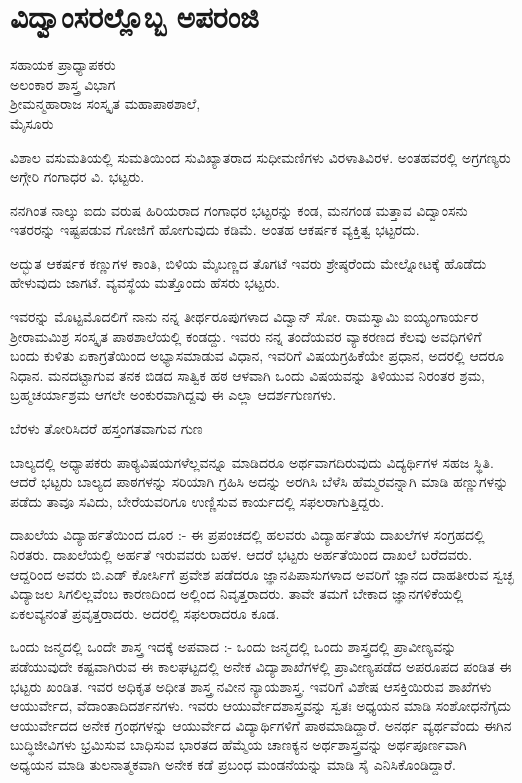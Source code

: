 \chapter{ವಿದ್ವಾಂಸರಲ್ಲೊಬ್ಬ ಅಪರಂಜಿ}

\begin{center}
\smallskip

ಸಹಾಯಕ ಪ್ರಾಧ್ಯಾಪಕರು\\
ಅಲಂಕಾರ ಶಾಸ್ತ್ರ ವಿಭಾಗ\\
ಶ್ರೀಮನ್ಮಹಾರಾಜ ಸಂಸ್ಕೃತ ಮಹಾಪಾಠಶಾಲೆ,\\ 
ಮೈಸೂರು
\end{center}

ವಿಶಾಲ ವಸುಮತಿಯಲ್ಲಿ ಸುಮತಿಯಿಂದ ಸುವಿಖ್ಯಾತರಾದ ಸುಧೀಮಣಿಗಳು ವಿರಳಾತಿವಿರಳ.  ಅಂತಹವರಲ್ಲಿ ಅಗ್ರಗಣ್ಯರು ಅಗ್ಗೇರಿ ಗಂಗಾಧರ ವಿ. ಭಟ್ಟರು.

ನನಗಿಂತ ನಾಲ್ಕು ಐದು ವರುಷ ಹಿರಿಯರಾದ ಗಂಗಾಧರ ಭಟ್ಟರನ್ನು ಕಂಡ, ಮನಗಂಡ ಮತ್ತಾವ ವಿದ್ವಾಂಸನು ಇತರರನ್ನು ಇಷ್ಟಪಡುವ ಗೋಜಿಗೆ ಹೋಗುವುದು ಕಡಿಮೆ.  ಅಂತಹ ಆಕರ್ಷಕ ವ್ಯಕ್ತಿತ್ವ ಭಟ್ಟರದು.

ಅದ್ಭುತ ಆಕರ್ಷಕ ಕಣ್ಣುಗಳ ಕಾಂತಿ, ಬಿಳಿಯ ಮೈಬಣ್ಣದ ತೊಗಟೆ ಇವರು ಶ್ರೇಷ್ಠರೆಂದು  ಮೇಲ್ನೋಟಕ್ಕೆ ಹೊಡೆದು ಹೇಳುವುದು ಜಾಗಟೆ. ವ್ಯವಸ್ಥೆಯ ಮತ್ತೊಂದು ಹೆಸರು ಭಟ್ಟರು.

ಇವರನ್ನು ಮೊಟ್ಟಮೊದಲಿಗೆ ನಾನು ನನ್ನ ತೀರ್ಥರೂಪುಗಳಾದ ವಿದ್ವಾನ್ ಸೋ. ರಾಮಸ್ವಾಮಿ ಐಯ್ಯಂಗಾರ್ಯರ ಶ್ರೀರಾಮಮಿಶ್ರ ಸಂಸ್ಕೃತ ಪಾಠಶಾಲೆಯಲ್ಲಿ ಕಂಡದ್ದು.  ಇವರು ನನ್ನ ತಂದೆಯವರ ವ್ಯಾಕರಣದ ಕೆಲವು ಅವಧಿಗಳಿಗೆ ಬಂದು ಕುಳಿತು ಏಕಾಗ್ರತೆಯಿಂದ ಅಭ್ಯಾಸಮಾಡುವ ವಿಧಾನ, ಇವರಿಗೆ ವಿಷಯಗ್ರಹಿಕೆಯೇ ಪ್ರಧಾನ, ಅದರಲ್ಲಿ ಆದರೂ ನಿಧಾನ. ಮನದಟ್ಟಾಗುವ ತನಕ ಬಿಡದ ಸಾತ್ವಿಕ ಹಠ ಆಳವಾಗಿ ಒಂದು ವಿಷಯವನ್ನು ತಿಳಿಯುವ ನಿರಂತರ ಶ್ರಮ, ಬ್ರಹ್ಮಚರ್ಯಾಶ್ರಮ ಆಗಲೇ ಅಂಕುರವಾಗಿದ್ದವು ಈ ಎಲ್ಲಾ ಆದರ್ಶಗುಣಗಳು.

ಬೆರಳು ತೋರಿಸಿದರೆ ಹಸ್ತಂಗತವಾಗುವ ಗುಣ

ಬಾಲ್ಯದಲ್ಲಿ ಅಧ್ಯಾಪಕರು ಪಾಠ್ಯವಿಷಯಗಳೆಲ್ಲವನ್ನೂ ಮಾಡಿದರೂ ಅರ್ಥವಾಗದಿರುವುದು ವಿದ್ಯರ್ಥಿಗಳ ಸಹಜ ಸ್ಥಿತಿ.  ಆದರೆ ಭಟ್ಟರು ಬಾಲ್ಯದ ಪಾಠಗಳನ್ನು ಸರಿಯಾಗಿ ಗ್ರಹಿಸಿ ಅದನ್ನು ಅರಗಿಸಿ ಬೆಳೆಸಿ ಹೆಮ್ಮರವನ್ನಾಗಿ ಮಾಡಿ ಹಣ್ಣುಗಳನ್ನು ಪಡೆದು ತಾವೂ ಸವಿದು, ಬೇರೆಯವರಿಗೂ ಉಣ್ಣಿಸುವ ಕಾರ್ಯದಲ್ಲಿ ಸಫಲರಾಗುತ್ತಿದ್ದರು.

ದಾಖಲೆಯ ವಿದ್ಯಾರ್ಹತೆಯಿಂದ ದೂರ :- ಈ ಪ್ರಪಂಚದಲ್ಲಿ ಹಲವರು ವಿದ್ಯಾರ್ಹತೆಯ ದಾಖಲೆಗಳ ಸಂಗ್ರಹದಲ್ಲಿ ನಿರತರು.  ದಾಖಲೆಯಲ್ಲಿ ಅರ್ಹತೆ ಇರುವವರು ಬಹಳ.  ಆದರೆ ಭಟ್ಟರು ಅರ್ಹತೆಯಿಂದ ದಾಖಲೆ ಬರೆದವರು.  ಆದ್ದರಿಂದ ಅವರು ಬಿ.ಎಡ್ ಕೋರ್ಸಿಗೆ ಪ್ರವೇಶ ಪಡೆದರೂ ಜ್ಞಾನಪಿಪಾಸುಗಳಾದ ಅವರಿಗೆ ಜ್ಞಾನದ ದಾಹತೀರುವ ಸ್ವಚ್ಛ ವಿದ್ಯಾಜಲ ಸಿಗಲಿಲ್ಲವೆಂಬ ಕಾರಣದಿಂದ ಅಲ್ಲಿಂದ ನಿವೃತ್ತರಾದರು.  ತಾವೇ ತಮಗೆ ಬೇಕಾದ ಜ್ಞಾನಗಳಿಕೆಯಲ್ಲಿ ಏಕಲವ್ಯನಂತೆ ಪ್ರವೃತ್ತರಾದರು.  ಅದರಲ್ಲಿ ಸಫಲರಾದರೂ ಕೂಡ.

ಒಂದು ಜನ್ಮದಲ್ಲಿ ಒಂದೇ ಶಾಸ್ತ್ರ ಇದಕ್ಕೆ ಅಪವಾದ :- ಒಂದು ಜನ್ಮದಲ್ಲಿ ಒಂದು ಶಾಸ್ತ್ರದಲ್ಲಿ ಪ್ರಾವೀಣ್ಯವನ್ನು ಪಡೆಯುವುದೇ ಕಷ್ಟವಾಗಿರುವ ಈ ಕಾಲಘಟ್ಟದಲ್ಲಿ ಅನೇಕ ವಿದ್ಯಾಶಾಖೆಗಳಲ್ಲಿ ಪ್ರಾವೀಣ್ಯಪಡೆದ ಅಪರೂಪದ ಪಂಡಿತ ಈ ಭಟ್ಟರು ಖಂಡಿತ.  ಇವರ ಅಧಿಕೃತ ಅಧೀತ ಶಾಸ್ತ್ರ ನವೀನ ನ್ಯಾಯಶಾಸ್ತ್ರ.  ಇವರಿಗೆ ವಿಶೇಷ ಆಸಕ್ತಿಯಿರುವ ಶಾಖೆಗಳು ಆಯುರ್ವೇದ, ವೆದಾಂತಾದಿದರ್ಶನಗಳು.  ಇವರು ಆಯುರ್ವೇದಶಾಸ್ತ್ರವನ್ನು ಸ್ವತಃ ಅಧ್ಯಯನ ಮಾಡಿ ಸಂಶೋಧನೆಗೈದು ಆಯುರ್ವೇದದ ಅನೇಕ ಗ್ರಂಥಗಳನ್ನು ಆಯುರ್ವೇದ ವಿದ್ಯಾರ್ಥಿಗಳಿಗೆ ಪಾಠಮಾಡಿದ್ದಾರೆ.  ಅನರ್ಥ ವ್ಯರ್ಥವೆಂದು ಈಗಿನ ಬುದ್ಧಿಜೀವಿಗಳು ಭ್ರಮಿಸುವ ಬಾಧಿಸುವ ಭಾರತದ ಹೆಮ್ಮೆಯ ಚಾಣಕ್ಯನ ಅರ್ಥಶಾಸ್ತ್ರವನ್ನು ಅರ್ಥಪೂರ್ಣವಾಗಿ ಅಧ್ಯಯನ ಮಾಡಿ ತುಲನಾತ್ಮಕವಾಗಿ ಅನೇಕ ಕಡೆ ಪ್ರಬಂಧ ಮಂಡನೆಯನ್ನು ಮಾಡಿ ಸೈ ಎನಿಸಿಕೊಂಡಿದ್ದಾರೆ.

